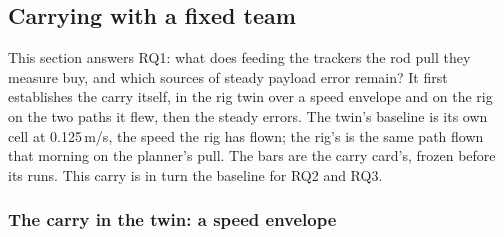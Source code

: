 
\subsection{Carrying with a fixed team}
\label{sec:res_carry}

This section answers RQ1: what does feeding the trackers the rod pull they measure buy, and which sources of steady
payload error remain? It first establishes the carry itself, in the rig twin over a speed envelope and on the rig on
the two paths it flew, then the steady errors. The twin's baseline is its own cell at 0.125\,m/s, the speed the rig
has flown; the rig's is the same path flown that morning on the planner's pull. The bars are the carry card's,
frozen before its runs. This carry is in turn the baseline for RQ2 and RQ3.



\subsubsection{The carry in the twin: a speed envelope}
\label{sec:res_envelope}

